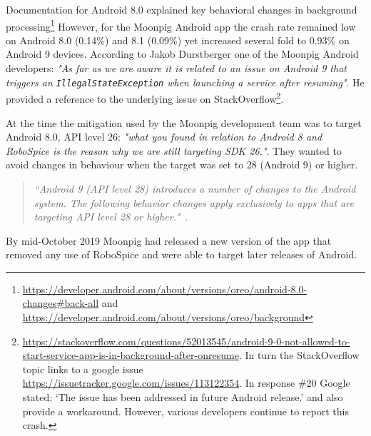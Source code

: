 Documentation for Android 8.0 explained key behavioral changes in background processing\footnote{\url{https://developer.android.com/about/versions/oreo/android-8.0-changes\#back-all} and \url{https://developer.android.com/about/versions/oreo/background}} However, for the Moonpig Android app the crash rate remained low on Android 8.0 (0.14\%) and 8.1 (0.09\%) yet increased several fold to 0.93\% on Android 9 devices. According to Jakob Durstberger one of the Moonpig Android developers: \textit{"As far as we are aware it is related to an issue on Android 9 that triggers an \texttt{IllegalStateException} when launching a service after resuming"}. He provided a reference to the underlying issue on StackOverflow\footnote{\url{https://stackoverflow.com/questions/52013545/android-9-0-not-allowed-to-start-service-app-is-in-background-after-onresume}. In turn the StackOverflow topic links to a google issue \url{https://issuetracker.google.com/issues/113122354}. In response \#20 Google stated: `The issue has been addressed in future Android release.' and also provide a workaround. However, various developers continue to report this crash.}.

At the time the mitigation used by the Moonpig development team was to target Android 8.0, API level 26: \textit{"what you found in relation to Android 8 and RoboSpice is the reason why we are still targeting SDK 26."}. They wanted to avoid changes in behaviour when the target was set to 28 (Android 9) or higher.

\begin{quote}
    \emph{``Android 9 (API level 28) introduces a number of changes to the Android system. The following behavior changes apply exclusively to apps that are targeting API level 28 or higher."}~\citep{android_behavior_changes_apps_targeting_api_level_28plus}.
\end{quote}

By mid-October 2019 Moonpig had released a new version of the app that removed any use of RoboSpice and were able to target later releases of Android.

